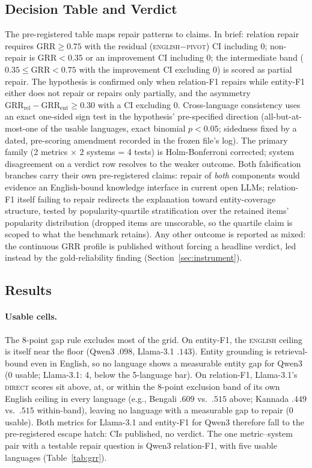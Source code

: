 \documentclass{llncs}
\begin{document}
\subsection{Decision Table and Verdict}\label{sec:decision}
The pre-registered table maps repair patterns to claims. In brief: relation
repair requires $\mathrm{GRR} \geq 0.75$ with the residual
(\textsc{english}$-$\textsc{pivot}) CI including 0; non-repair is
$\mathrm{GRR} < 0.35$ or an improvement CI including 0; the intermediate band
($0.35 \leq \mathrm{GRR} < 0.75$ with the improvement CI excluding 0) is
scored as partial repair. The hypothesis is confirmed only when relation-F1
repairs while entity-F1 either does not repair or repairs only partially, and
the asymmetry $\mathrm{GRR}_{\text{rel}} - \mathrm{GRR}_{\text{ent}} \geq 0.30$
with a CI excluding 0. Cross-language consistency uses an exact one-sided
sign test in the hypothesis' pre-specified direction (all-but-at-most-one of
the usable languages, exact binomial $p<0.05$; sidedness fixed by a dated,
pre-scoring amendment recorded in the frozen file's log). The primary family
(2 metrics $\times$ 2 systems = 4 tests) is Holm-Bonferroni corrected; system
disagreement on a verdict row resolves to the weaker outcome. Both
falsification branches carry their own pre-registered claims: repair of
\emph{both} components would evidence an English-bound knowledge interface
in current open LLMs; relation-F1 itself failing to repair redirects the
explanation toward entity-coverage structure, tested by popularity-quartile
stratification over the retained items' popularity distribution (dropped
items are unscorable, so the quartile claim is scoped to what the benchmark
retains). Any other outcome is reported as mixed: the continuous GRR profile
is published without forcing a headline verdict, led instead by the
gold-reliability finding (Section~\ref{sec:instrument}).

\subsection{Results}\label{sec:results}

\paragraph{Usable cells.} The 8-point gap rule excludes most of the grid.
On entity-F1, the \textsc{english}
ceiling is itself near the floor (Qwen3 $.098$, Llama-3.1 $.143$). Entity
grounding is retrieval-bound even in English, so no language shows a
measurable entity gap for Qwen3 (0 usable; Llama-3.1: 4, below the 5-language
bar). On relation-F1, Llama-3.1's \textsc{direct} scores sit above, at, or
within the 8-point exclusion band of its own English ceiling in every
language (e.g., Bengali $.609$ vs.\ $.515$ above; Kannada $.449$ vs.\ $.515$
within-band), leaving no language with a measurable gap to repair (0 usable).
Both metrics for Llama-3.1 and entity-F1 for Qwen3 therefore fall to the
pre-registered escape hatch: CIs published, no verdict. The one
metric--system pair with a testable repair question is Qwen3 relation-F1,
with five usable languages (Table~\ref{tab:grr}).
\end{document}
